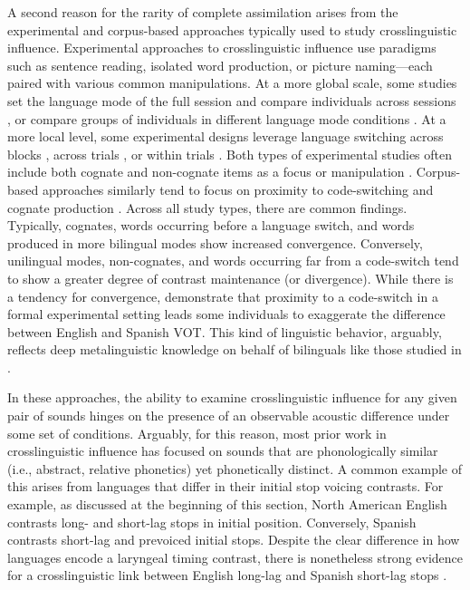 A second reason for the rarity of complete assimilation arises from the experimental and corpus-based approaches typically used to study crosslinguistic influence. Experimental approaches to crosslinguistic influence use paradigms such as sentence reading, isolated word production, or picture naming---each paired with various common manipulations. At a more global scale, some studies set the language mode of the full session and compare individuals across sessions \citep{grosjean_2011_transfer, simonet_2019_convergence, sancier_1997_drift}, or compare groups of individuals in different language mode conditions \citep{antoniou_2010_context}. At a more local level, some experimental designs leverage language switching across blocks \citep{sundara_2006_production}, across trials \citep{goldrick_2014_switching}, or within trials \citep[i.e., prompted code-switching;][]{bullock_2009_sociophonetics, antoniou_2011_VOT, olson_2016_transfer}. Both types of experimental studies often include both cognate and non-cognate items as a focus or manipulation \citep[e.g.,][]{goldrick_2014_switching}. Corpus-based approaches similarly tend to focus on proximity to code-switching \citep{fricke_2016_phonetic, balukas_2015_vot} and cognate production \citep{brown_2015_finegrained}. Across all study types, there are common findings. Typically, cognates, words occurring before a language switch, and words produced in more bilingual modes show increased convergence. Conversely, unilingual modes, non-cognates, and words occurring far from a code-switch tend to show a greater degree of contrast maintenance (or divergence). While there is a tendency for convergence, \citet{bullock_2009_sociophonetics} demonstrate that proximity to a code-switch in a formal experimental setting leads some individuals to exaggerate the difference between English and Spanish VOT. This kind of linguistic behavior, arguably, reflects deep metalinguistic knowledge on behalf of bilinguals like those studied in \citet{bullock_2009_sociophonetics}.

In these approaches, the ability to examine crosslinguistic influence for any given pair of sounds hinges on the presence of an observable acoustic difference under some set of conditions. Arguably, for this reason, most prior work in crosslinguistic influence has focused on sounds that are phonologically similar (i.e., abstract, relative phonetics) yet phonetically distinct. A common example of this arises from languages that differ in their initial stop voicing contrasts. For example, as discussed at the beginning of this section, North American English contrasts long- and short-lag stops in initial position. Conversely, Spanish contrasts short-lag and prevoiced initial stops. Despite the clear difference in how languages encode a laryngeal timing contrast, there is nonetheless strong evidence for a crosslinguistic link between English long-lag and Spanish short-lag stops \citep{casillas_2021_interlingual, fricke_2016_phonetic, goldrick_2014_switching, bullock_2009_sociophonetics, olson_2016_transfer}. 

